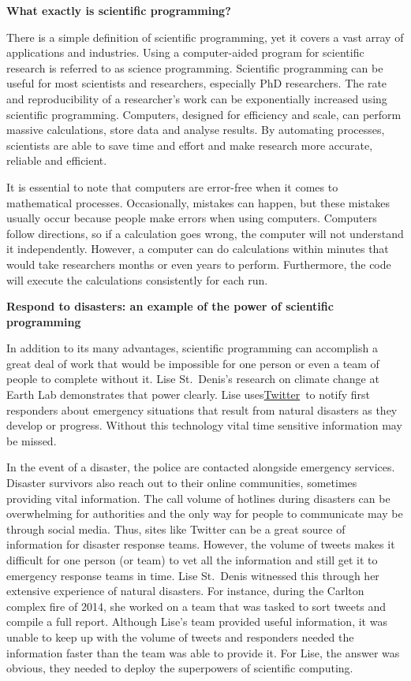 \documentclass[
]{book}
\begin{document}
\textbf{What exactly is scientific programming?}

There is a simple definition of scientific programming, yet it covers a vast array of applications and industries. Using a computer-aided program for scientific research is referred to as science programming. Scientific programming can be useful for most scientists and researchers, especially PhD researchers. The rate and reproducibility of a researcher's work can be exponentially increased using scientific programming. Computers, designed for efficiency and scale, can perform massive calculations, store data and analyse results. By automating processes, scientists are able to save time and effort and make research more accurate, reliable and efficient.

It is essential to note that computers are error-free when it comes to mathematical processes. Occasionally, mistakes can happen, but these mistakes usually occur because people make errors when using computers. Computers follow directions, so if a calculation goes wrong, the computer will not understand it independently. However, a computer can do calculations within minutes that would take researchers months or even years to perform. Furthermore, the code will execute the calculations consistently for each run.

\textbf{Respond to disasters: an example of the power of scientific programming}

In addition to its many advantages, scientific programming can accomplish a great deal of work that would be impossible for one person or even a team of people to complete without it. Lise St.~Denis's research on climate change at Earth Lab demonstrates that power clearly. Lise uses\href{https://twitter.com/lastdenis}{}\href{https://twitter.com/lastdenis}{Twitter}~to notify first responders about emergency situations that result from natural disasters as they develop or progress. Without this technology vital time sensitive information may be missed.

In the event of a disaster, the police are contacted alongside emergency services. Disaster survivors also reach out to their online communities, sometimes providing vital information. The call volume of hotlines during disasters can be overwhelming for authorities and the only way for people to communicate may be through social media. Thus, sites like Twitter can be a great source of information for disaster response teams. However, the volume of tweets makes it difficult for one person (or team) to vet all the information and still get it to emergency response teams in time. Lise St.~Denis witnessed this through her extensive experience of natural disasters. For instance, during the Carlton complex fire of 2014, she worked on a team that was tasked to sort tweets and compile a full report. Although Lise's team provided useful information, it was unable to keep up with the volume of tweets and responders needed the information faster than the team was able to provide it. For Lise, the answer was obvious, they needed to deploy the superpowers of scientific computing.
\end{document}
